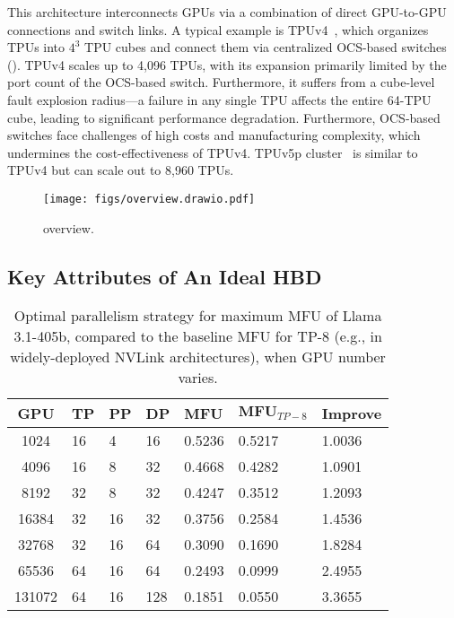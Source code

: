 This architecture interconnects GPUs via a combination of direct GPU-to-GPU connections and switch links. A typical example is TPUv4~\cite{isca2023tpu}, which organizes TPUs into $4^3$ TPU cubes and connect them via centralized OCS-based switches (). TPUv4 scales up to 4,096 TPUs, with its expansion primarily limited by the port count of the OCS-based switch. Furthermore, it suffers from a cube-level fault explosion radius—a failure in any single TPU affects the entire 64-TPU cube, leading to significant performance degradation. Furthermore, OCS-based switches face challenges of high costs and manufacturing complexity, which undermines the cost-effectiveness of TPUv4. TPUv5p cluster~\cite{tpuv5} is similar to TPUv4 but can scale out to 8,960 TPUs.

\begin{figure*}[!tp]
    \centering
    \texttt{[image: figs/overview.drawio.pdf]}
    \vspace{-5ex}
    \caption{\sys{} overview.}
    \label{fig:overview}
    \vspace{-2ex}
\end{figure*}

\subsection{Key Attributes of An Ideal HBD}
\label{sec:background:workload}


\vspace{-1em}
\begin{table}[h!t] \small
    \centering
    \begin{tabular}{cllllll}
    \toprule
    \textbf{GPU} & \textbf{TP} & \textbf{PP} & \textbf{DP} & \textbf{MFU} & \textbf{$\textbf{MFU}_{TP-8}$} & \textbf{Improve}\\
    \midrule
    1024    & 16 & 4  & 16  & 0.5236 & 0.5217   & 1.0036      \\
    4096    & 16 & 8  & 32  & 0.4668 & 0.4282   & 1.0901      \\
    8192    & 32 & 8  & 32  & 0.4247 & 0.3512   & 1.2093      \\
    16384   & 32 & 16 & 32  & 0.3756 & 0.2584   & 1.4536      \\
    32768   & 32 & 16 & 64  & 0.3090 & 0.1690   & 1.8284      \\
    65536   & 64 & 16 & 64  & 0.2493 & 0.0999   & 2.4955      \\
    131072  & 64 & 16 & 128 & 0.1851 & 0.0550   & 3.3655      \\
    \bottomrule
    \end{tabular}
    \caption{Optimal parallelism strategy for maximum MFU of Llama 3.1-405b, compared to the baseline MFU for TP-8 (e.g., in widely-deployed NVLink architectures), when GPU number varies.}
    \label{tab:eval:llama3-optimal}
    \vspace{-2em}
\end{table}

